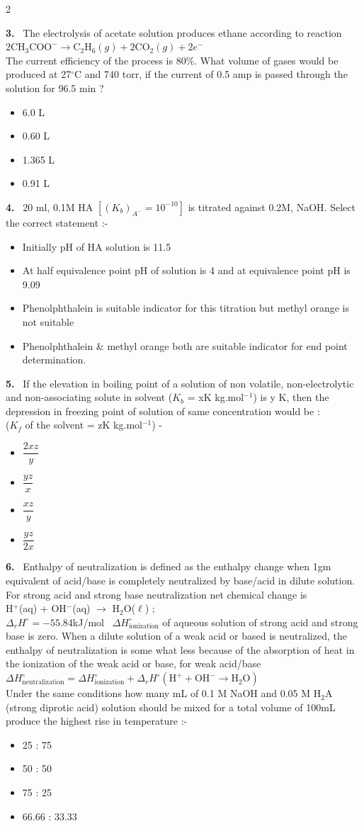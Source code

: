 \documentclass[10pt]{extarticle}
\newcommand{\qn}[1]{\par\smallskip\noindent\textbf{#1.}~}
\newenvironment{qoptions}{\begin{itemize}[leftmargin=1.8em,itemsep=1pt,topsep=2pt,label={}]}{\end{itemize}}
\newcommand{\opt}[2]{\item[(#1)] #2}
\begin{document}
\begin{multicols}{2}
\qn{3} The electrolysis of acetate solution produces ethane according to reaction\\
$2\text{CH}_3\text{COO}^-\rightarrow\text{C}_2\text{H}_6(g)+2\text{CO}_2(g)+2e^-$\\
The current efficiency of the process is 80\%. What volume of gases would be produced at 27$^\circ$C and 740 torr, if the current of 0.5 amp is passed through the solution for 96.5 min ?
\begin{qoptions}
\opt{A}{6.0 L}
\opt{B}{0.60 L}
\opt{C}{1.365 L}
\opt{D}{0.91 L}
\end{qoptions}

\qn{4} 20 ml, 0.1M HA $\left[(K_b)_{A^-}=10^{-10}\right]$ is titrated against 0.2M, NaOH. Select the correct statement :-\\
\relax[Given : log2 = 0.3, log3 = 0.48]
\begin{qoptions}
\opt{A}{Initially pH of HA solution is 11.5}
\opt{B}{At half equivalence point pH of solution is 4 and at equivalence point pH is 9.09}
\opt{C}{Phenolphthalein is suitable indicator for this titration but methyl orange is not suitable}
\opt{D}{Phenolphthalein \& methyl orange both are suitable indicator for end point determination.}
\end{qoptions}

\qn{5} If the elevation in boiling point of a solution of non volatile, non-electrolytic and non-associating solute in solvent ($K_b$ = xK kg.mol$^{-1}$) is y K, then the depression in freezing point of solution of same concentration would be :\\
($K_f$ of the solvent = zK kg.mol$^{-1}$) -
\begin{qoptions}
\opt{A}{$\dfrac{2xz}y$}
\opt{B}{$\dfrac{yz}x$}
\opt{C}{$\dfrac{xz}y$}
\opt{D}{$\dfrac{yz}{2x}$}
\end{qoptions}

\qn{6} Enthalpy of neutralization is defined as the enthalpy change when 1gm equivalent of acid/base is completely neutralized by base/acid in dilute solution. For strong acid and strong base neutralization net chemical change is\\
H$^+$(aq) + OH$^-$(aq) $\rightarrow$ H$_2$O($\ell$) ;\\
$\Delta_rH^\circ=-55.84$kJ/mol \ $\Delta H^\circ_{\text{ionization}}$ of aqueous solution of strong acid and strong base is zero. When a dilute solution of a weak acid or based is neutralized, the enthalpy of neutralization is some what less because of the absorption of heat in the ionization of the weak acid or base, for weak acid/base\\
$\Delta H^\circ_{\text{neutralization}}=\Delta H^\circ_{\text{ionization}}+\Delta_rH^\circ(\text{H}^++\text{OH}^-\rightarrow\text{H}_2\text{O})$\\
Under the same conditions how many mL of 0.1 M NaOH and 0.05 M H$_2$A (strong diprotic acid) solution should be mixed for a total volume of 100mL produce the highest rise in temperature :-
\begin{qoptions}
\opt{A}{25 : 75}
\opt{B}{50 : 50}
\opt{C}{75 : 25}
\opt{D}{66.66 : 33.33}
\end{qoptions}


\end{multicols}
\end{document}
